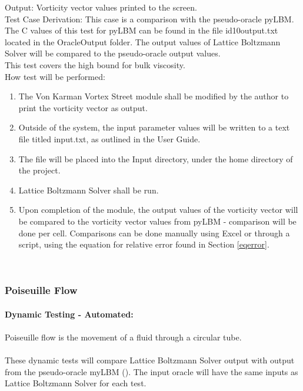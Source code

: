 \documentclass[12pt, titlepage]{article}
\newcommand{\famname}{Lattice Boltzmann Solver}
\begin{document}
\begin{enumerate}
Output: Vorticity vector values printed to the screen. \\ 

Test Case Derivation: This case is a comparison with the pseudo-oracle
pyLBM. The C values of this test for pyLBM can be found in the file
id10output.txt located in the OracleOutput folder. The output values of {\famname} will be compared to the pseudo-oracle output values.\\

This test covers the high bound for bulk viscosity.\\
					
How test will be performed: 

\begin{enumerate}
\item The Von Karman Vortex Street module shall be modified by the author to
  print the vorticity vector as output.
\item Outside of the system, the input parameter values will be written to a text file titled input.txt, as outlined in the User Guide.
\item The file will be placed into the Input directory, under the home directory
of the project.
\item {\famname} shall be run.
\item Upon completion of the module, the output values of the vorticity vector
will be compared to the vorticity vector values from pyLBM - comparison will be
done per cell. Comparisons can be done manually using Excel or through a
script, using the equation for relative error found in Section \ref{eqerror}.\\
\end{enumerate}

\end{enumerate}
~\newpage

\subsubsection{Poiseuille Flow}
\label{frpf}

\paragraph{Dynamic Testing - Automated:}
\paragraph{} 
Poiseuille flow is the movement of a fluid through a circular tube.
\paragraph{} These dynamic tests will compare {\famname} output with output from
the pseudo-oracle myLBM (\citet{pylbmcode}). The input oracle will have the same
inputs as {\famname} for each test.
\end{document}
